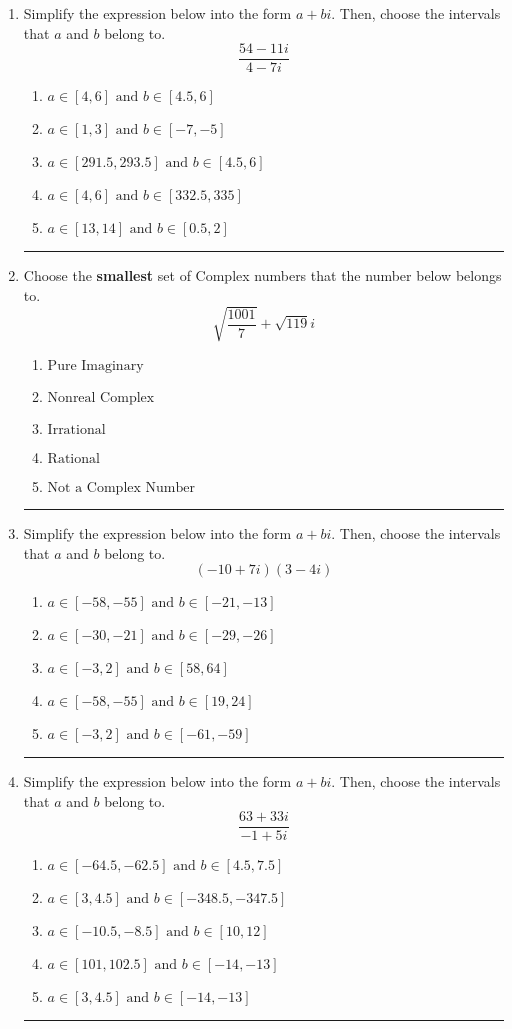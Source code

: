\documentclass[14pt]{extbook}
\newcommand{\litem}[1]{\item#1\hspace*{-1cm}\rule{\textwidth}{0.4pt}}
\begin{document}
\begin{enumerate}
{\begin{enumerate}[label=\Alph*.]
\end{enumerate} }
\litem{
Simplify the expression below into the form $a+bi$. Then, choose the intervals that $a$ and $b$ belong to.\[ \frac{54 - 11 i}{4 - 7 i} \]\begin{enumerate}[label=\Alph*.]
\item \( a \in [4, 6] \text{ and } b \in [4.5, 6] \)
\item \( a \in [1, 3] \text{ and } b \in [-7, -5] \)
\item \( a \in [291.5, 293.5] \text{ and } b \in [4.5, 6] \)
\item \( a \in [4, 6] \text{ and } b \in [332.5, 335] \)
\item \( a \in [13, 14] \text{ and } b \in [0.5, 2] \)

\end{enumerate} }
\litem{
Choose the \textbf{smallest} set of Complex numbers that the number below belongs to.\[ \sqrt{\frac{1001}{7}}+\sqrt{119} i \]\begin{enumerate}[label=\Alph*.]
\item \( \text{Pure Imaginary} \)
\item \( \text{Nonreal Complex} \)
\item \( \text{Irrational} \)
\item \( \text{Rational} \)
\item \( \text{Not a Complex Number} \)

\end{enumerate} }
\litem{
Simplify the expression below into the form $a+bi$. Then, choose the intervals that $a$ and $b$ belong to.\[ (-10 + 7 i)(3 - 4 i) \]\begin{enumerate}[label=\Alph*.]
\item \( a \in [-58, -55] \text{ and } b \in [-21, -13] \)
\item \( a \in [-30, -21] \text{ and } b \in [-29, -26] \)
\item \( a \in [-3, 2] \text{ and } b \in [58, 64] \)
\item \( a \in [-58, -55] \text{ and } b \in [19, 24] \)
\item \( a \in [-3, 2] \text{ and } b \in [-61, -59] \)

\end{enumerate} }
\litem{
Simplify the expression below into the form $a+bi$. Then, choose the intervals that $a$ and $b$ belong to.\[ \frac{63 + 33 i}{-1 + 5 i} \]\begin{enumerate}[label=\Alph*.]
\item \( a \in [-64.5, -62.5] \text{ and } b \in [4.5, 7.5] \)
\item \( a \in [3, 4.5] \text{ and } b \in [-348.5, -347.5] \)
\item \( a \in [-10.5, -8.5] \text{ and } b \in [10, 12] \)
\item \( a \in [101, 102.5] \text{ and } b \in [-14, -13] \)
\item \( a \in [3, 4.5] \text{ and } b \in [-14, -13] \)


\end{enumerate}}
\end{enumerate}
\end{document}
